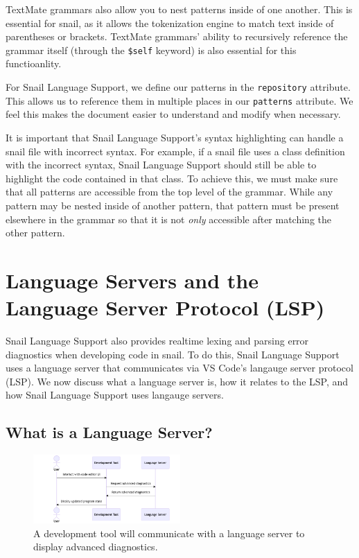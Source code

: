 \documentclass{article}
\begin{document}
TextMate grammars also allow you to nest patterns inside of one another. This is essential for snail, as it allows the tokenization engine to match text inside of parentheses or brackets. TextMate grammars' ability to recursively reference the grammar itself (through the \lstinline{$self} keyword) is also essential for this functioanlity. 

For Snail Language Support, we define our patterns in the \lstinline{repository} attribute. This allows us to reference them in multiple places in our \lstinline{patterns} attribute. We feel this makes the document easier to understand and modify when necessary. 

It is important that Snail Language Support's syntax highlighting can handle a snail file with incorrect syntax. For example, if a snail file uses a class definition with the incorrect syntax, Snail Language Support should still be able to highlight the code contained in that class. To achieve this, we must make sure that all patterns are accessible from the top level of the grammar. While any pattern may be nested inside of another pattern, that pattern must be present elsewhere in the grammar so that it is not \emph{only} accessible after matching the other pattern.

\section{Language Servers and the Language Server Protocol (LSP)}

Snail Language Support also provides realtime lexing and parsing error diagnostics when developing code in snail. To do this, Snail Language Support uses a language server that communicates via VS Code's langauge server protocol (LSP). We now discuss what a language server is, how it relates to the LSP, and how Snail Language Support uses langauge servers. 

\subsection{What is a Language Server?}

\begin{figure}
    \begin{center}
        \includegraphics[width=0.5\textwidth]{language-server.png}
        \caption{
            \centering 
            A development tool will communicate with a language server to display advanced diagnostics.
        }
        \label{fig:language-server}
    \end{center}
\end{figure}
\end{document}
